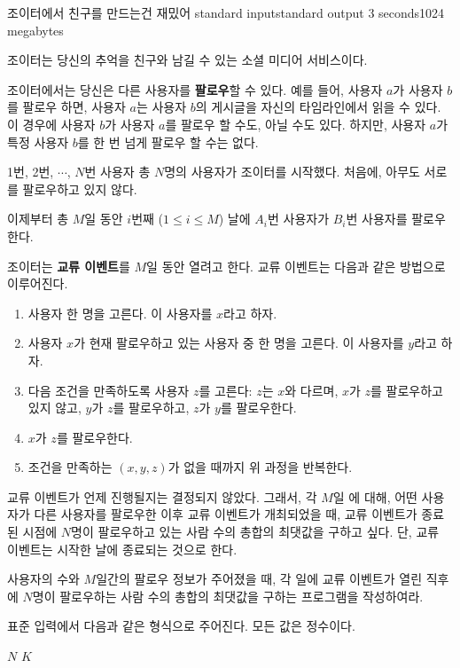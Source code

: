 \begin{problem}{조이터에서 친구를 만드는건 재밌어}
	{standard input}{standard output}
	{3 seconds}{1024 megabytes}{}
	
	조이터는 당신의 추억을 친구와 남길 수 있는 소셜 미디어 서비스이다.
	
	조이터에서는 당신은 다른 사용자를 \textbf{팔로우}할 수 있다. 예를 들어, 사용자 $a$가 사용자 $b$를 팔로우 하면, 사용자 $a$는 사용자 $b$의 게시글을 자신의 타임라인에서 읽을 수 있다. 이 경우에 사용자 $b$가 사용자 $a$를 팔로우 할 수도, 아닐 수도 있다. 하지만, 사용자 $a$가 특정 사용자 $b$를 한 번 넘게 팔로우 할 수는 없다.
	
	1번, 2번, $\cdots$, $N$번 사용자 총 $N$명의 사용자가 조이터를 시작했다. 처음에, 아무도 서로를 팔로우하고 있지 않다.
	
	이제부터 총 $M$일 동안 $i$번째 ($1 \le i \le M$) 날에 $A_i$번 사용자가 $B_i$번 사용자를 팔로우한다. 
	
	조이터는 \textbf{교류 이벤트}를 $M$일 동안 열려고 한다. 교류 이벤트는 다음과 같은 방법으로 이루어진다.
	
	\begin{enumerate}
		\item 사용자 한 명을 고른다. 이 사용자를 $x$라고 하자.
		\item 사용자 $x$가 현재 팔로우하고 있는 사용자 중 한 명을 고른다. 이 사용자를 $y$라고 하자.
		\item 다음 조건을 만족하도록 사용자 $z$를 고른다: $z$는 $x$와 다르며, $x$가 $z$를 팔로우하고 있지 않고, $y$가 $z$를 팔로우하고, $z$가 $y$를 팔로우한다.
		\item $x$가 $z$를 팔로우한다.
		\item 조건을 만족하는 $(x, y, z)$가 없을 때까지 위 과정을 반복한다.
	\end{enumerate}
	
	교류 이벤트가 언제 진행될지는 결정되지 않았다. 그래서, 각 $M$일 에 대해, 어떤 사용자가 다른 사용자를 팔로우한 이후 교류 이벤트가 개최되었을 때, 교류 이벤트가 종료된 시점에 $N$명이 팔로우하고 있는 사람 수의 총합의 최댓값을 구하고 싶다. 단, 교류 이벤트는 시작한 날에 종료되는 것으로 한다.
	
	사용자의 수와 $M$일간의 팔로우 정보가 주어졌을 때, 각 일에 교류 이벤트가 열린 직후에 $N$명이 팔로우하는 사람 수의 총합의 최댓값을 구하는 프로그램을 작성하여라.
	
	
\InputFile

표준 입력에서 다음과 같은 형식으로 주어진다. 모든 값은 정수이다.

$N$ $K$


\end{problem}
